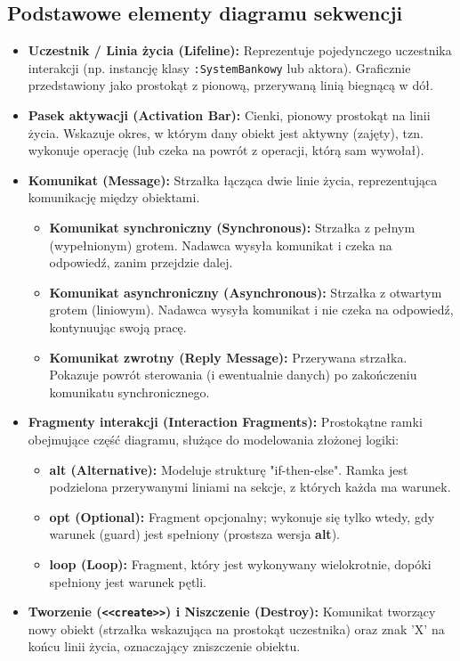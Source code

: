 \documentclass[a4paper,12pt]{article}
\begin{document}
\subsection{Podstawowe elementy diagramu sekwencji}
\begin{itemize}
    \item \textbf{Uczestnik / Linia życia (Lifeline):} Reprezentuje pojedynczego uczestnika interakcji (np. instancję klasy \texttt{:SystemBankowy} lub aktora). Graficznie przedstawiony jako prostokąt z pionową, przerywaną linią biegnącą w dół.
    \item \textbf{Pasek aktywacji (Activation Bar):} Cienki, pionowy prostokąt na linii życia. Wskazuje okres, w którym dany obiekt jest aktywny (zajęty), tzn. wykonuje operację (lub czeka na powrót z operacji, którą sam wywołał).
    \item \textbf{Komunikat (Message):} Strzałka łącząca dwie linie życia, reprezentująca komunikację między obiektami.
        \begin{itemize}
            \item \textbf{Komunikat synchroniczny (Synchronous):} Strzałka z pełnym (wypełnionym) grotem. Nadawca wysyła komunikat i czeka na odpowiedź, zanim przejdzie dalej.
            \item \textbf{Komunikat asynchroniczny (Asynchronous):} Strzałka z otwartym grotem (liniowym). Nadawca wysyła komunikat i nie czeka na odpowiedź, kontynuując swoją pracę.
            \item \textbf{Komunikat zwrotny (Reply Message):} Przerywana strzałka. Pokazuje powrót sterowania (i ewentualnie danych) po zakończeniu komunikatu synchronicznego.
        \end{itemize}
    \item \textbf{Fragmenty interakcji (Interaction Fragments):} Prostokątne ramki obejmujące część diagramu, służące do modelowania złożonej logiki:
        \begin{itemize}
            \item \textbf{alt (Alternative):} Modeluje strukturę "if-then-else". Ramka jest podzielona przerywanymi liniami na sekcje, z których każda ma warunek.
            \item \textbf{opt (Optional):} Fragment opcjonalny; wykonuje się tylko wtedy, gdy warunek (guard) jest spełniony (prostsza wersja \textbf{alt}).
            \item \textbf{loop (Loop):} Fragment, który jest wykonywany wielokrotnie, dopóki spełniony jest warunek pętli.
        \end{itemize}
    \item \textbf{Tworzenie (\texttt{<<create>>}) i Niszczenie (Destroy):} Komunikat tworzący nowy obiekt (strzałka wskazująca na prostokąt uczestnika) oraz znak 'X' na końcu linii życia, oznaczający zniszczenie obiektu.
\end{itemize}
\end{document}
